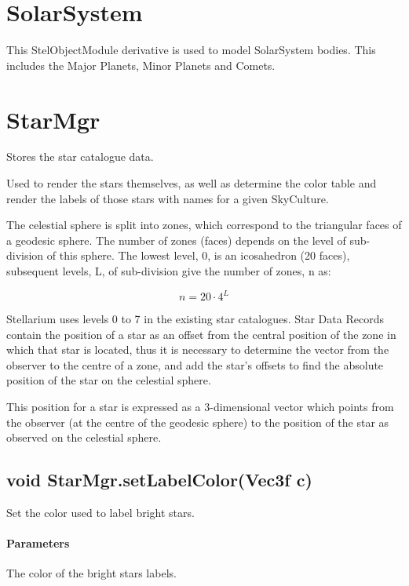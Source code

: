 \section{SolarSystem}
\label{sec:ScriptingAPI:SolarSystem}
This StelObjectModule derivative is used to model SolarSystem bodies. This includes the Major Planets, Minor Planets and Comets.

\section{StarMgr}
\label{sec:ScriptingAPI:StarMgr}

Stores the star catalogue data.

Used to render the stars themselves, as well as determine the color table and render the labels of those stars with names for a given SkyCulture.

The celestial sphere is split into zones, which correspond to the triangular faces of a geodesic sphere. The number of zones (faces) depends on the level of sub-division of this sphere. The lowest level, 0, is an icosahedron (20 faces), subsequent levels, L, of sub-division give the number of zones, n as:

\begin{equation}
n=20 \cdot 4^L
\end{equation}

Stellarium uses levels 0 to 7 in the existing star catalogues. Star Data Records contain the position of a star as an offset from the central position of the zone in which that star is located, thus it is necessary to determine the vector from the observer to the centre of a zone, and add the star's offsets to find the absolute position of the star on the celestial sphere.

This position for a star is expressed as a 3-dimensional vector which points from the observer (at the centre of the geodesic sphere) to the position of the star as observed on the celestial sphere.

\subsection{void StarMgr.setLabelColor(Vec3f c)}
\label{sec:ScriptingAPI:StarMgr:setLabelColor}
Set the color used to label bright stars.

\paragraph{Parameters}
\begin{description}[align=right,labelwidth=3cm,leftmargin=3.2cm]
\item[\parameter{c}] The color of the bright stars labels.
\end{description}

